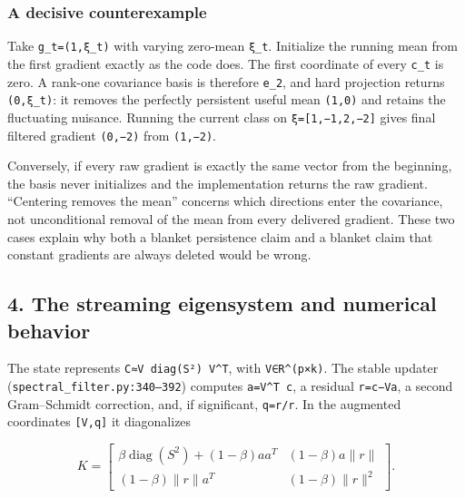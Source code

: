\documentclass[
  british,
  10pt,
  a4paper,
]{article}
\begin{document}
\subsubsection{A decisive
counterexample}\label{mathematical-audit--a-decisive-counterexample}

Take
\texttt{g\_\allowbreak{}t=\allowbreak{}(1,\allowbreak{}ξ\_\allowbreak{}t)}
with varying zero-mean \texttt{ξ\_t}. Initialize the running mean from
the first gradient exactly as the code does. The first coordinate of
every \texttt{c\_t} is zero. A rank-one covariance basis is therefore
\texttt{e\_2}, and hard projection returns \texttt{(0,ξ\_t)}: it removes
the perfectly persistent useful mean \texttt{(1,0)} and retains the
fluctuating nuisance. Running the current class on
\texttt{ξ=\allowbreak{}[1,\allowbreak{}−1,\allowbreak{}2,\allowbreak{}−2]}
gives final filtered gradient \texttt{(0,−2)} from \texttt{(1,−2)}.

Conversely,\allowbreak{} if every raw gradient is exactly the same
vector from the beginning, the basis never initializes and the
implementation returns the raw gradient. ``Centering removes the mean''
concerns which directions enter the covariance,\allowbreak{} not
unconditional removal of the mean from every delivered gradient. These
two cases explain why both a blanket persistence claim and a blanket
claim that constant gradients are always deleted would be wrong.

\subsection{4. The streaming eigensystem and numerical
behavior}\label{mathematical-audit--the-streaming-eigensystem-and-numerical-behavior}

The state represents
\texttt{C≈V \allowbreak{}diag(S²) \allowbreak{}V\textasciicircum{}T},
with \texttt{V∈R\^{}(p×k)}. The stable updater
(\texttt{spectral\_\allowbreak{}filter.\allowbreak{}py:\allowbreak{}340–392})
computes \texttt{a=V\^{}T\ c}, a residual \texttt{r=c−Va}, a second
Gram--Schmidt correction,\allowbreak{} and, if significant,\allowbreak{}
\texttt{q=r/\textbar{}\textbar{}r\textbar{}\textbar{}}. In the augmented
coordinates \texttt{{[}V,q{]}} it diagonalizes

\[
K=\begin{bmatrix}
\beta\operatorname{diag}(S^2)+(1-\beta)aa^T & (1-\beta)a\|r\|\\
(1-\beta)\|r\|a^T & (1-\beta)\|r\|^2
\end{bmatrix}.
\]
\end{document}
